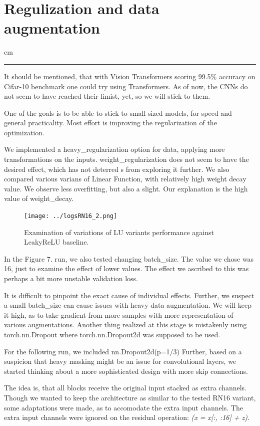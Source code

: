 \documentclass[12pt,a4paper]{article}
\newcommand {\sectionrule}{\vskip -0.9 cm
\color {mygray} \rule [0 cm] {17 cm}{0.1 mm} \color {black}}
\begin{document}
\newpage

\section{Regulization and data augmentation}
\sectionrule

It should be mentioned, that with Vision Transformers scoring 99.5\% accuracy
on Cifar-10 benchmark one could try using Transformers. As of now, the
CNNs do not seem to have reached their limist, yet, so we will stick to them.

One of the goals is to be able to stick to small-sized models, for speed and
general practicality. Most effort is improving the regularization of
the optimization.

We implemented a heavy\_regularization option
for data, applying more transformations on the inputs. weight\_regularization
does not seem to have the desired effect, which has not deterred s from exploring it further.
We also compared various varians of Linear Function, with relatively high
weight decay value. We observe less overfitting, but also a slight. Our
explanation is the high value of weight\_decay.

\begin{figure}[H]
  \texttt{[image: ../logsRN16\_2.png]}
  \caption{Examination of variations of LU variants performance against LeakyReLU baseline.}
\end{figure}

\newpage

In the Figure 7. run, we also tested changing batch\_size. The value we chose was
16, just to examine the effect of lower values. The effect we ascribed to this
was perhaps a bit more unstable validation loss. 

It is difficult to pinpoint the exact cause of individual effects. Further,
we suspect a small batch\_size can cause issues with heavy data augmentation.
We will keep it high, as to take gradient from more samples with more
representation of various augmentations.
Another thing realized at this stage is mistakenly using torch.nn.Dropout
where torch.nn.Dropout2d was supposed to be used.

For the following run, we included nn.Dropout2d(p=1/3)
Further, based on a suspicion that heavy masking might be an issue
for convolutional layers, we started thinking about a more sophisticated
design with more skip connections.

The idea is, that all blocks receive the original input stacked
as extra channels.
Though we wanted to keep the architecture as similar to the tested
RN16 variant, some adaptations were made, as to accomodate the extra input
channels. The extra input channels were ignored on
the residual operation: \emph{(x = x[:, :16] + z)}.
\end{document}
